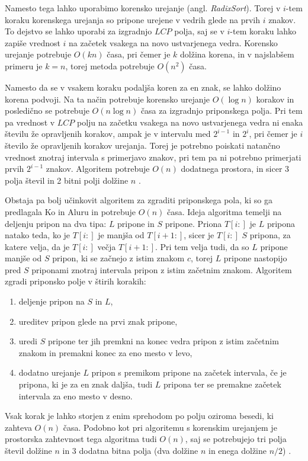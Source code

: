 Namesto tega lahko uporabimo korensko urejanje (angl. \textit{RadixSort}). Torej v $i$-tem koraku korenskega urejanja so pripone urejene v vedrih glede na prvih $i$ znakov. To dejstvo se lahko uporabi za izgradnjo $LCP$ polja, saj se v $i$-tem koraku lahko zapiše vrednost $i$ na začetek vsakega na novo ustvarjenega vedra. Korensko urejanje potrebuje $O(kn)$ časa, pri čemer je $k$ dolžina korena, in v najslabšem primeru je $k=n$, torej metoda potrebuje $O(n^2)$ časa.

Namesto da se v vsakem koraku podaljša koren za en znak, se lahko dolžino korena podvoji. Na ta način potrebuje korensko urejanje $O(\log{n})$ korakov in posledično se potrebuje $O(n\log{n})$ časa za izgradnjo priponskega polja. Pri tem pa vrednost v $LCP$ polju na začetku vsakega na novo ustvarjenega vedra ni enaka številu že opravljenih korakov, ampak je v intervalu med $2^{i-1}$ in $2^{i}$, pri čemer je $i$ število že opravljenih korakov urejanja. Torej je potrebno poiskati natančno vrednost znotraj intervala s primerjavo znakov, pri tem pa ni potrebno primerjati prvih $2^{i-1}$ znakov. Algoritem potrebuje $O(n)$ dodatnega prostora, in sicer 3 polja števil in 2 bitni polji dolžine $n$ \cite{Manber1990}.


Obstaja pa bolj učinkovit algoritem za zgraditi priponskega pola, ki so ga predlagala Ko in Aluru \cite{Ko2005} in potrebuje $O(n)$ časa. Ideja algoritma temelji na deljenju pripon na dva tipa: $L$ pripone in $S$ pripone. Priona $T[i:]$ je $L$ pripona natako teda, ko je  $T[i:]$ je manjša od $T[i+1:]$, sicer je $T[i:]$ $S$ pripona, za katere velja, da je $T[i:]$ večja $T[i+1:]$. Pri tem velja tudi, da so $L$ pripone manjše od $S$ pripon, ki se začnejo z istim znakom $c$, torej $L$ pripone nastopijo pred $S$ priponami znotraj intervala pripon z istim začetnim znakom. Algoritem zgradi priponsko polje v štirih korakih:
\begin{enumerate}
    \item deljenje pripon na $S$ in $L$,
    \item ureditev pripon glede na prvi znak pripone,
    \item uredi $S$ pripone ter jih premkni na konec vedra pripon z istim začetnim znakom in premakni konec za eno mesto v levo,
    \item dodatno urejanje $L$ pripon s premikom pripone na začetek intervala, če je pripona, ki je za en znak daljša, tudi $L$ pripona ter se premakne začetek intervala za eno mesto v desno.
\end{enumerate}
Vsak korak je lahko storjen z enim sprehodom po polju oziroma besedi, ki zahteva $O(n)$ časa. Podobno kot pri algoritemu s korenskim urejanjem je prostorska zahtevnost tega algoritma tudi $O(n)$, saj se potrebujejo tri polja števil dolžine $n$ in 3 dodatna bitna polja (dva dolžine $n$ in enega dolžine $n/2$) \cite{Ko2005}.